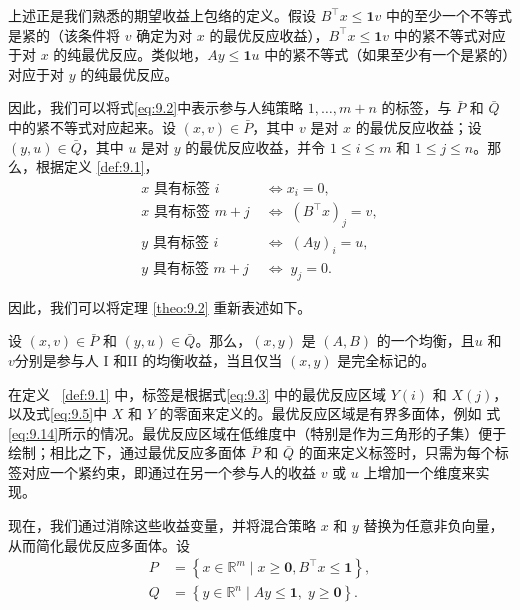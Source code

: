 上述正是我们熟悉的期望收益上包络的定义。假设 \({B}^{\top }x \leq  \mathbf{1}v\) 中的至少一个不等式是紧的（该条件将 \(v\) 确定为对 \(x\) 的最优反应收益），\({B}^{\top }x \leq  \mathbf{1}v\) 中的紧不等式对应于对 \(x\) 的纯最优反应。类似地，\({Ay} \leq  \mathbf{1}u\) 中的紧不等式（如果至少有一个是紧的）对应于对 \(y\) 的纯最优反应。


因此，我们可以将式\eqref{eq:9.2}中表示参与人纯策略 \(1,\ldots,m + n\) 的标签，与 \(\bar{P}\) 和 \(\bar{Q}\) 中的紧不等式对应起来。设 \(\left( {x,v}\right)  \in  \bar{P}\)，其中 \(v\) 是对 \(x\) 的最优反应收益；设 \(\left( {y,u}\right)  \in  \bar{Q}\)，其中 \(u\) 是对 \(y\) 的最优反应收益，并令 \(1 \leq  i \leq  m\) 和 \(1 \leq  j \leq  n\)。那么，根据定义 \ref{def:9.1}，
\begin{equation}  \label{eq:9.23}
\begin{aligned}
x\text{ 具有标签 }i & \Leftrightarrow  {x}_{i} = 0, \\
x\text{ 具有标签 }m + j\; & \Leftrightarrow  \;{\left( {B}^{\top }x\right) }_{j} = v, \\
y\text{ 具有标签 }i\; & \Leftrightarrow  \;{\left( Ay\right) }_{i} = u, \\
y\text{ 具有标签 }m + j\; & \Leftrightarrow  \;{y}_{j} = 0.
\end{aligned}
\end{equation}


因此，我们可以将定理 \ref{theo:9.2}  重新表述如下。

\begin{corollary}  \label{coro:9.8}  %
设 \(\left( {x,v}\right)  \in  \bar{P}\) 和 \(\left( {y,u}\right)  \in  \bar{Q}\)。那么，$(x, y)$ 是 $(A, B)$ 的一个均衡，且\(u\) 和 \(v\)分别是参与人 I 和II 的均衡收益，当且仅当 $(x, y)$ 是完全标记的。
\end{corollary}


在定义 ~\ref{def:9.1} 中，标签是根据式\eqref{eq:9.3} 中的最优反应区域 \(Y\left( i\right)\) 和 \(X\left( j\right)\)，以及式\eqref{eq:9.5}中 \(X\) 和 \(Y\) 的零面来定义的。最优反应区域是有界多面体，例如 式\eqref{eq:9.14}所示的情况。最优反应区域在低维度中（特别是作为三角形的子集）便于绘制；相比之下，通过最优反应多面体 \(\bar{P}\) 和 \(\bar{Q}\) 的面来定义标签时，只需为每个标签对应一个紧约束，即通过在另一个参与人的收益 \(v\) 或 \(u\) 上增加一个维度来实现。


现在，我们通过消除这些收益变量，并将混合策略 \(x\) 和 \(y\) 替换为任意非负向量，从而简化最优反应多面体。设
\begin{equation}
\label{eq:9.24}
\begin{aligned}
P & = \left\{  {x \in  {\mathbb{R}}^{m} \mid  x \geq  \mathbf{0},{B}^{\top }x \leq  \mathbf{1}}\right\}, \\
Q & = \left\{  {y \in  {\mathbb{R}}^{n} \mid  {Ay} \leq  \mathbf{1},\;y \geq  \mathbf{0}}\right\}.
\end{aligned}
\end{equation}

